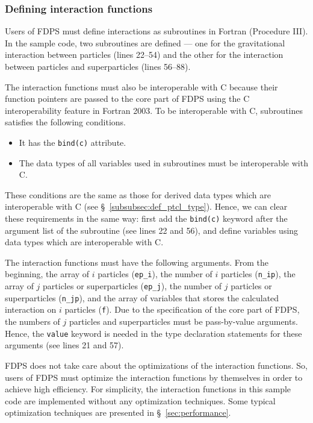 \documentclass[proof,useamsfonts]{pasj01}
\begin{document}
\subsubsection{Defining interaction functions}
\label{subsubsec:def_interact_func}
Users of FDPS must define interactions as subroutines in Fortran (Procedure III). In the sample code, two subroutines are defined --- one for the gravitational interaction between particles (lines 22--54) and the other for the interaction between particles and superparticles (lines 56--88).

The interaction functions must also be interoperable with C because their function pointers are passed to the core part of FDPS using the C interoperability feature in Fortran 2003. To be interoperable with C, subroutines satisfies the following conditions.
\begin{itemize}
\item It has the \texttt{bind(c)} attribute.
\item The data types of all variables used in subroutines must be interoperable with C.
\end{itemize}
These conditions are the same as those for derived data types which are interoperable with C (see \S~\ref{subsubsec:def_ptcl_type}). Hence, we can clear these requirements in the same way: first add the \texttt{bind(c)} keyword after the argument list of the subroutine (see lines 22 and 56), and define variables using data types which are interoperable with C.

The interaction functions must have the following arguments. From the beginning, the array of $i$ particles (\texttt{ep\_i}), the number of $i$ particles (\texttt{n\_ip}), the array of $j$ particles or superparticles (\texttt{ep\_j}), the number of $j$ particles or superparticles (\texttt{n\_jp}), and the array of variables that stores the calculated interaction on $i$ particles (\texttt{f}). Due to the specification of the core part of FDPS, the numbers of $j$ particles and superparticles must be pass-by-value arguments. Hence, the \texttt{value} keyword is needed in the type declaration statements for these arguments (see lines 21 and 57).

FDPS does not take care about the optimizations of the interaction functions. So, users of FDPS must optimize the interaction functions by themselves in order to achieve high efficiency. For simplicity, the interaction functions in this sample code are implemented without any optimization techniques. Some typical optimization techniques are presented in \S~\ref{sec:performance}.
\end{document}
